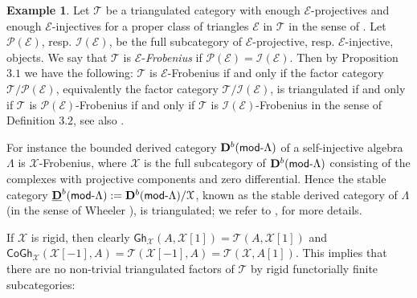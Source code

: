 \documentclass[oneside, a4paper,reqno]{amsart}
\numberwithin{equation}{section}
\theoremstyle{definition}
\newtheorem{exam}[thm]{Example}
\begin{document}
\begin{exam} Let ${\mathcal T}$ be a triangulated category with enough ${\mathscr E}$-projectives and enough ${\mathscr E}$-injectives for a proper class of triangles ${\mathscr E}$ in ${\mathcal T}$ in the sense of \cite{B:3cats}. Let  $\mathcal P({\mathscr E})$, resp. $\mathcal I({\mathscr E})$, be the full subcategory of ${\mathscr E}$-projective, resp. ${\mathscr E}$-injective, objects.  We say that ${\mathcal T}$ is ${\mathscr E}$-{\em Frobenius} if $\mathcal P({\mathscr E}) = \mathcal I({\mathscr E})$.  Then by Proposition $3.1$ we have the following: ${\mathcal T}$ is ${\mathscr E}$-Frobenius if and only if the factor category ${\mathcal T}/\mathcal P({\mathscr E})$, equivalently the factor category ${\mathcal T}/\mathcal I({\mathscr E})$, is triangulated if and only if ${\mathcal T}$ is $\mathcal P({\mathscr E})$-Frobenius if and only if ${\mathcal T}$ is $\mathcal I({\mathscr E})$-Frobenius in the sense of  Definition $3.2$, see also \cite[Theorem 7.2]{B:3cats}. 

For instance  the bounded derived category ${\bf D}^{b}(\operatorname*{\mathsf{mod}-\!}\Lambda)$ of a self-injective algebra $\Lambda$ is ${\mathcal X}$-Frobenius, where ${\mathcal X}$ is the full subcategory of ${\bf D}^{b}(\operatorname*{\mathsf{mod}-\!}\Lambda)$ consisting of the complexes with projective components and zero differential. Hence the stable category $\underline{{\bf D}}^{b}(\operatorname*{\mathsf{mod}-\!}\Lambda) := {\bf D}^{b}(\operatorname*{\mathsf{mod}-\!}\Lambda)/{\mathcal X}$, known as the  stable derived category of $\Lambda$ (in the sense of Wheeler \cite{Wheeler}), is triangulated; we refer to \cite{Wheeler}, \cite{B:3cats} for more details.      
\end{exam}

If ${\mathcal X}$ is rigid, then clearly $\mathsf{Gh}_{\mathcal X}(A,{\mathcal X}[1]) = {\mathcal T}(A,{\mathcal X}[1])$ and $\mathsf{CoGh}_{\mathcal X}({\mathcal X}[-1],A) = {\mathcal T}({\mathcal X}[-1],A) = {\mathcal T}({\mathcal X},A[1])$. This implies that there are no non-trivial triangulated factors of ${\mathcal T}$ by rigid functorially finite subcategories:
\end{document}

